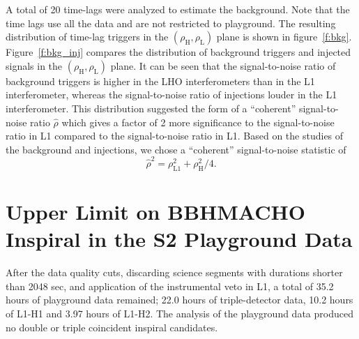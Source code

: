A total of 20 time-lags were analyzed to estimate the background. Note that
the time lags use all the data and are not restricted to playground. The
resulting distribution of time-lag triggers in the
$(\rho_{\mathrm{H}},\rho_{\mathrm{L}})$ plane is shown in figure~\ref{f:bkg}.
Figure~\ref{f:bkg_inj} compares the distribution of background triggers and
injected signals in the $(\rho_{\mathrm{H}},\rho_{\mathrm{L}})$ plane. It can
be seen that the signal-to-noise ratio of background triggers is higher in the
LHO interferometers than in the L1 interferometer, whereas the signal-to-noise
ratio of injections louder in the L1 interferometer. This distribution
suggested the form of a ``coherent'' signal-to-noise ratio $\hat{\rho}$ which
gives a factor of 2 more significance to the signal-to-noise ratio in L1
compared to the signal-to-noise ratio in L1. Based on the studies of the
background and injections, we chose a ``coherent'' signal-to-noise statistic of
\begin{equation}
\hat{\rho}^2 = \rho^2_{\mathrm{L1}} +  \rho_{\mathrm{H}}^2 / 4.
\label{e:combined-snr}
\end{equation}

\section{Upper Limit on BBHMACHO Inspiral in the S2 Playground Data}
\label{s:s2upperlimit}

After the data quality cuts, discarding science segments with durations
shorter than 2048 sec, and application of the instrumental veto in L1, a
total of {35.2} hours of playground data remained; {22.0} hours of
triple-detector data,  {10.2} hours of L1-H1 and {3.97} hours of L1-H2. The
analysis of the playground data produced no double or triple coincident
inspiral candidates.

